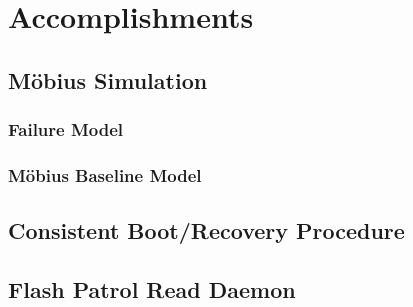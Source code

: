 \section{Accomplishments}

\subsection{M\"obius Simulation}

\subsubsection{Failure Model}

\subsubsection{M\"obius Baseline Model}

\subsection{Consistent Boot/Recovery Procedure}


\subsection{Flash Patrol Read Daemon}

